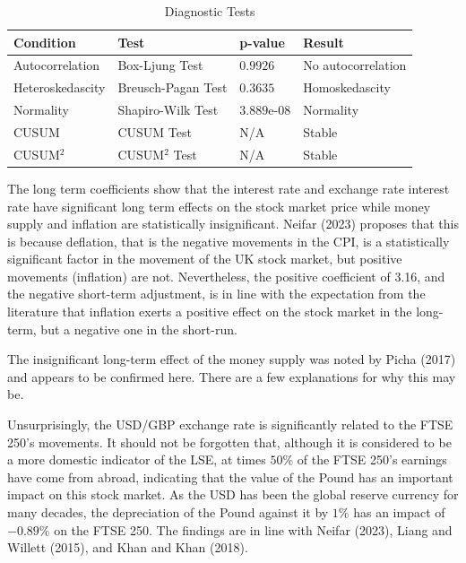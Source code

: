 \documentclass[11pt,a4paper]{article}
\begin{document}
\begin{table}[h!]
    \centering
    \caption{Diagnostic Tests}
    \begin{tabular}{llll}
        \toprule
        \textbf{Condition} & \textbf{Test} & \textbf{p-value} & \textbf{Result} \\
        \midrule
        Autocorrelation & Box-Ljung Test & $0.9926$ & No autocorrelation \\
        Heteroskedascity & Breusch-Pagan Test & $0.3635$ & Homoskedascity \\
        Normality & Shapiro-Wilk Test & $3.889$e-$08$ & Normality \\
        CUSUM & CUSUM Test & N/A & Stable \\
        CUSUM$^2$ & CUSUM$^2$ Test & N/A & Stable \\
        \bottomrule
    \end{tabular}
\end{table}

The long term coefficients show that the interest rate and exchange rate
interest rate have significant long term effects on the stock market price
while money supply and inflation are statistically insignificant. Neifar (2023) 
proposes that this is because deflation, that is the negative movements in the 
CPI, is a statistically significant factor in the movement of the UK stock 
market, but positive movements (inflation) are not. Nevertheless, the positive
coefficient of 3.16, and the negative short-term adjustment, is in line with the expectation from the literature that 
inflation exerts a positive effect on the stock market in the long-term, but a negative 
one in the short-run. 

The insignificant long-term effect of the money supply 
was noted by Picha (2017) and appears to be confirmed here. There are a few explanations
for why this may be.

Unsurprisingly, the USD/GBP exchange rate is significantly related to the FTSE 250's movements. It 
should not be forgotten that, although it is considered to be a more domestic indicator of the LSE, 
at times $50\%$ of the FTSE 250's earnings have come from abroad, indicating that 
the value of the Pound has an important impact on this stock market. As the USD has been 
the global reserve currency for many decades, the depreciation of the Pound 
against it by $1\%$ has an impact of $-0.89\%$ on the FTSE 250. The findings 
are in line with Neifar (2023), Liang and Willett (2015), and Khan and Khan (2018).
\end{document}
